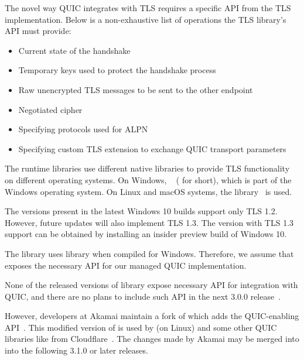 The novel way QUIC integrates with TLS requires a specific API from the TLS implementation. Below is
a non-exhaustive list of operations the TLS library's API must provide:

\begin{itemize}

  \item Current state of the handshake

  \item Temporary keys used to protect the handshake process

  \item Raw unencrypted TLS messages to be sent to the other endpoint

  \item Negotiated cipher

  \item Specifying protocols used for ALPN

  \item Specifying custom TLS extension to exchange QUIC transport parameters

\end{itemize}

The \dotnet{} runtime libraries use different native libraries to provide TLS functionality on
different operating systems. On Windows, ~\cite{Schannel} (\libschannel{}
for short), which is part of the Windows operating system. On Linux and macOS systems, the
\libopenssl{} library~\cite{OpenSSLWeb} is used.

\begin{description}

     The \libschannel{} versions present in the latest Windows 10
builds support only TLS 1.2. However, future updates will also implement TLS 1.3. The \libschannel{}
version with TLS 1.3 support can be obtained by installing an insider preview build of Windows 10.

    The \libmsquic{} library uses \libschannel{} library when compiled for Windows. Therefore, we
assume that \libschannel{} exposes the necessary API for our managed QUIC implementation.

    \ditem{\libopenssl{}} None of the released versions of \libopenssl{} library expose necessary
API for integration with QUIC, and there are no plans to include such API in the next \libopenssl{}
3.0.0 release~\cite{OpensslBlogNoQuic}.

    However, developers at Akamai maintain a fork of \libopenssl{} which adds the QUIC-enabling
API~\cite{AkamaiOpensslGithub}. This modified version of \libopenssl{} is used by \libmsquic{} (on
Linux) and some other QUIC libraries like  from Cloudflare~\cite{quicheGithub}. The
changes made by Akamai may be merged into \libopenssl{} into the following 3.1.0 or later releases.

\end{description}

